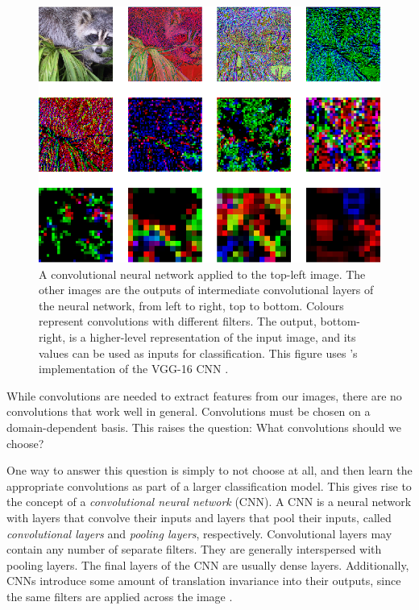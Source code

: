         \begin{figure}[!ht]
            \centering
            \includegraphics[width=\textwidth]{images/face_cnn.png}
            \caption{A convolutional neural network applied to the top-left
                image. The other images are the outputs of intermediate
                convolutional layers of the neural network, from left to right,
                top to bottom. Colours represent convolutions with different
                filters. The output, bottom-right, is a higher-level
                representation of the input image, and its values can be used
                as inputs for classification. This figure uses
                \citeauthor{baraldi15}'s implementation of the VGG-16 CNN
                \citep{simoyan14}.}
            \label{fig:face-cnn}
        \end{figure}

        While convolutions are needed to extract features from our images, there
        are no convolutions that work well in general. Convolutions must be
        chosen on a domain-dependent basis. This raises the question: What
        convolutions should we choose?

        One way to answer this question is simply to not choose at all, and
        then learn the appropriate convolutions as part of a larger
        classification model. This gives rise to the concept of a
        \emph{convolutional neural network} (CNN). A CNN is a neural network
        with layers that convolve their inputs and layers that pool their
        inputs, called \emph{convolutional layers} and \emph{pooling layers},
        respectively. Convolutional layers may contain any number of separate
        filters. They are generally interspersed with pooling layers. The final
        layers of the CNN are usually dense layers. Additionally, CNNs introduce
        some amount of translation invariance into their outputs, since the same
        filters are applied across the image \citep{lecun98}.

